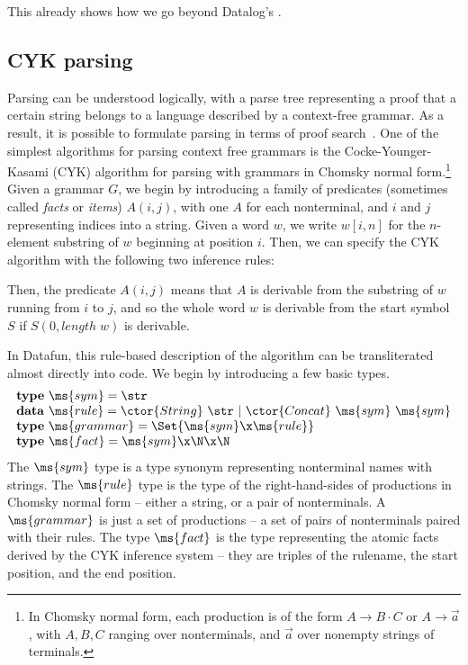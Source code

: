 \TODO This already shows how we go beyond Datalog's .


\subsection{CYK parsing}
Parsing can be understood logically, with a parse tree representing a
proof that a certain string belongs to a language described by a
context-free grammar. As a result, it is possible to formulate parsing
in terms of proof search~\cite{deductive-parsing}. One of the
simplest algorithms for parsing context free grammars is the
Cocke-Younger-Kasami (CYK) algorithm for parsing with grammars in
Chomsky normal form.\footnote{In Chomsky normal form, each production
  is of the form $A \to B \cdot C$ or $A \to \vec{a}$, with $A,B,C$
  ranging over nonterminals, and $\vec{a}$ over nonempty strings of
  terminals.}  Given a grammar $G$, we begin by introducing a family
of predicates (sometimes called \emph{facts} or \emph{items}) $A(i,j)$,
with one $A$ for each nonterminal, and $i$ and $j$ representing
indices into a string. Given a word $w$, we write $w[i,n]$ for the
$n$-element substring of $w$ beginning at position $i$. Then, we can
specify the CYK algorithm with the following two inference rules:
Then, the predicate $A(i,j)$ means that $A$ is derivable from the
substring of $w$ running from $i$ to $j$, and so the whole word $w$ is
derivable from the start symbol $S$ if $S(0, \mathit{length}\;w)$ is
derivable.

In Datafun, this rule-based description of the algorithm can be
transliterated almost directly into code. We begin by introducing a
few basic types.
\[\begin{array}{l}
\mathbf{type}~\ms{sym} = \str\\
\mathbf{data}~\ms{rule} = \ctor{String}~\str ~|~ \ctor{Concat}~\ms{sym}~\ms{sym}\\
\mathbf{type}~\ms{grammar} = \Set{\ms{sym} \x \ms{rule}}\\
\mathbf{type}~\ms{fact} = \ms{sym} \x \N \x \N\\
\end{array}\]
The $\ms{sym}$ type is a type synonym representing nonterminal names
with strings. The $\ms{rule}$ type is the type of the right-hand-sides
of productions in Chomsky normal form -- either a string, or a pair of
nonterminals. A $\ms{grammar}$ is just a set of productions -- a set
of pairs of nonterminals paired with their rules. The type $\ms{fact}$
is the type representing the atomic facts derived by the CYK inference
system -- they are triples of the rulename, the start position, and
the end position.

